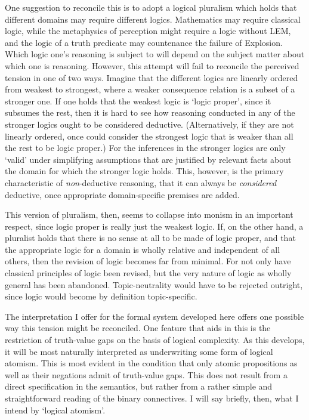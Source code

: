 One suggestion to reconcile this is to adopt a logical pluralism which holds that different domains may require different logics. Mathematics may require classical logic, while the metaphysics of perception might require a logic without LEM, and the logic of a truth predicate may countenance the failure of Explosion. Which logic one's reasoning is subject to will depend on the subject matter about which one is reasoning. However, this attempt will fail to reconcile the perceived tension in one of two ways. Imagine that the different logics are linearly ordered from weakest to strongest, where a weaker consequence relation is a subset of a stronger one. If one holds that the weakest logic is `logic proper', since it subsumes the rest, then it is hard to see how reasoning conducted in any of the stronger logics ought to be considered deductive. (Alternatively, if they are not linearly ordered, once could consider the strongest logic that is weaker than all the rest to be logic proper.) For the inferences in the stronger logics are only `valid' under simplifying assumptions that are justified by relevant facts about the domain for which the stronger logic holds. This, however, is the primary characteristic of \emph{non}-deductive reasoning, that it can always be \emph{considered} deductive, once appropriate domain-specific premises are added.

This version of pluralism, then, seems to collapse into monism in an important respect, since logic proper is really just the weakest logic.  If, on the other hand, a pluralist holds that there is no sense at all to be made of logic proper, and that the appropriate logic for a domain is wholly relative and independent of all others, then the revision of logic becomes far from minimal. For not only have classical principles of logic been revised, but the very nature of logic as wholly general has been abandoned. Topic-neutrality would have to be rejected outright, since logic would become by definition topic-specific.

The interpretation I offer for the formal system developed here offers one possible way this tension might be reconciled. One feature that aids in this is the restriction of truth-value gaps on the basis of logical complexity. As this develops, it will be most naturally interpreted as underwriting some form of logical atomism. This is most evident in the condition that only atomic propositions as well as their negations admit of truth-value gaps. This does not result from a direct specification in the semantics, but rather from a rather simple and straightforward reading of the binary connectives. I will say briefly, then, what I intend by `logical atomism'.

